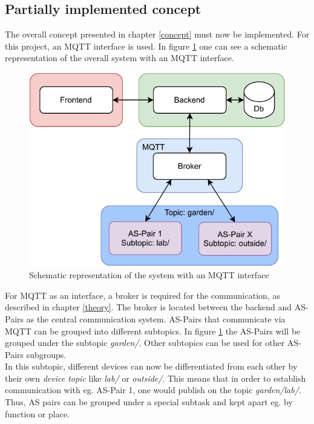 \subsection{Partially implemented concept}\label{conc_implement}

The overall concept presented in chapter \ref{concept} must now be implemented. For this project, an MQTT interface is used. In figure \ref{fig:mqtt_conc_system} one can see a schematic representation of the overall system with an MQTT interface.\\

\begin{figure}[H]
    \centering
    \includegraphics[width=.65\textwidth]{images/4_1/mqtt_concept.pdf}
    \caption{Schematic representation of the system with an MQTT interface}
    \label{fig:mqtt_conc_system}
\end{figure}

For MQTT as an interface, a broker is required for the communication, as described in chapter \ref{theory}.  The broker is located between the backend and AS-Pairs as the central communication system. AS-Pairs that communicate via MQTT can be grouped into different subtopics. In figure \ref{fig:mqtt_conc_system} the AS-Pairs will be grouped under the subtopic \textit{garden/}. Other subtopics can be used for other AS-Pairs subgroups.\\

In this subtopic, different devices can now be differentiated from each other by their own \textit{device topic} like \textit{lab/} or \textit{outside/}. This means that in order to establish communication with eg. AS-Pair 1, one would publish on the topic \textit{garden/lab/}.\\

Thus, AS pairs can be grouped under a special subtask and kept apart eg. by function or place.

